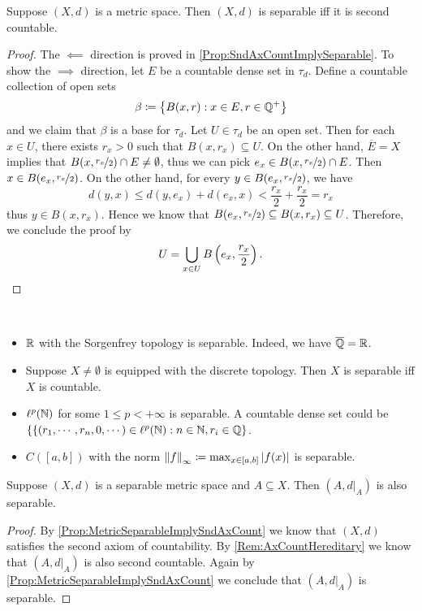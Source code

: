 \documentclass[screen]{techreport}
\numberwithin{equation}{section}
\begin{document}
\begin{proposition}\label{Prop:MetricSeparableImplySndAxCount}
	Suppose $(X,d)$ is a metric space.
	Then $(X,d)$ is separable iff it is second countable.
\end{proposition}
\begin{proof}
	The ${\impliedby}$ direction is proved in \cref{Prop:SndAxCountImplySeparable}.
	To show the ${\implies}$ direction, let $E$ be a countable dense set in $\tau_d$.
	Define a countable collection of open sets
	\[
	\beta \coloneqq \left\{ { B(x,r) : x \in E, r \in \mathbb{Q}^+} \right\}
	\]
	and we claim that $\beta$ is a base for $\tau_d$.
	Let $U \in \tau_d$ be an open set.
	Then for each $x \in U$, there exists $r_x > 0$ such that $B(x,r_x) \subseteq U$.
	On the other hand, $\overline{E} = X$ implies that $B(x,\nicefrac{r_x}{2}) \cap E \neq \emptyset$, thus we can pick $e_x \in B(x,\nicefrac{r_x}{2}) \cap E$.
	Then $x \in B(e_x,\nicefrac{r_x}{2})$.
	On the other hand, for every $y \in B(e_x,\nicefrac{r_x}{2})$, we have
	\[
	d(y,x) \le d(y,e_x) + d(e_x,x) < \frac{r_x}{2} + \frac{r_x}{2} = r_x
	\]
	thus $y \in B(x,r_x)$.
	Hence we know that $B(e_x,\nicefrac{r_x}{2}) \subseteq B(x,r_x) \subseteq U$.
	Therefore, we conclude the proof by
	\[
	U = \bigcup_{x \in U} B\left({e_x, \frac{r_x}{2}}\right).
	\]
\end{proof}

\begin{example}\label{Exa:SeparableSpaces}\
	\begin{itemize}
		\item $\mathbb{R}$ with the Sorgenfrey topology is separable. Indeed, we have $\overline{\mathbb{Q}} = \mathbb{R}$.
		\item Suppose $X \neq \emptyset$ is equipped with the discrete topology.
		Then $X$ is separable iff $X$ is countable.
		\item $\ell^p(\mathbb{N})$ for some $1 \le p < +\infty$ is separable.
		A countable dense set could be $\{  \{ (r_1,\cdots,r_n,0,\cdots) \in \ell^p(\mathbb{N}) : n \in \mathbb{N}, r_i \in \mathbb{Q} \}$.
		\item $C([a,b])$ with the norm $\left\|{f}\right\|_\infty \coloneqq \max_{x \in [a,b]} \left|{f(x)}\right|$ is separable.
	\end{itemize}
\end{example}

\begin{proposition}\label{Prop:SeparableMetricInduceSeparable}
	Suppose $(X,d)$ is a separable metric space and $A \subseteq X$.
	Then $(A,d|_A)$ is also separable.
\end{proposition}
\begin{proof}
	By \cref{Prop:MetricSeparableImplySndAxCount} we know that $(X,d)$ satisfies the second axiom of countability.
	By \cref{Rem:AxCountHereditary} we know that $(A,d|_A)$ is also second countable.
	Again by \cref{Prop:MetricSeparableImplySndAxCount} we conclude that $(A,d|_A)$ is separable.
\end{proof}
\end{document}
